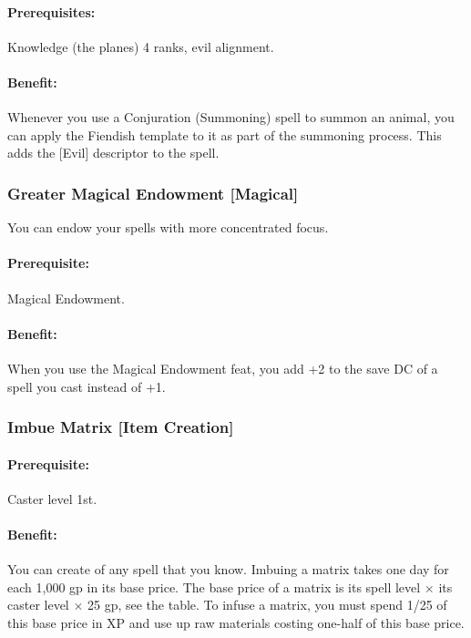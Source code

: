 \paragraph{Prerequisites:} Knowledge (the planes) 4 ranks, evil alignment.

\paragraph{Benefit:} Whenever you use a Conjuration (Summoning) spell to summon an animal, you can apply the Fiendish template to it as part of the summoning process. This adds the [Evil] descriptor to the spell.
\subsubsection[Greater Magical Endowment]{Greater Magical Endowment [Magical]}
\label{Feat:GreaterMagicalEndowment}
You can endow your spells with more concentrated focus.

\paragraph{Prerequisite:} Magical Endowment.

\paragraph{Benefit:} When you use the Magical Endowment feat, you add +2 to the save DC of a spell you cast instead of +1.
\subsubsection[Imbue Matrix]{Imbue Matrix [Item Creation]}
\label{Feat:ImbueMatrix}
\paragraph{Prerequisite:}
Caster level 1st.

\paragraph{Benefit:}
You can create  of any spell that you know. 
Imbuing a matrix takes one day for each 1,000 gp in its base price. 
The base price of a matrix is its spell level $\times$ its caster level $\times$ 25 gp, see the  table.
To infuse a matrix, you must spend 1/25 of this base price in XP and use up raw materials costing one-half of this base price.

